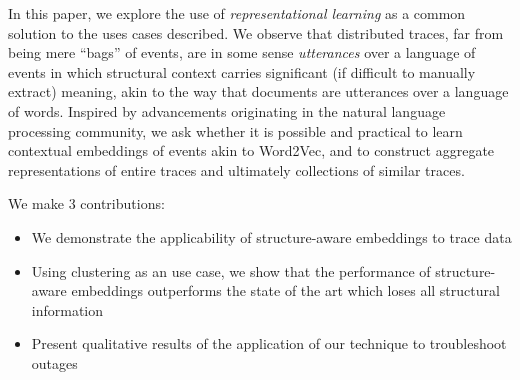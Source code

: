 In this paper, we explore the use of \emph{representational learning} as a common solution to the uses cases described.  We observe that distributed traces, far from being mere ``bags'' of events, are in some sense \emph{utterances} over a language of events in which structural context carries significant (if difficult to manually extract) meaning, akin to the way that documents are utterances over a language of words. Inspired by advancements originating in the natural language processing community, we ask whether it is possible and practical to learn contextual embeddings of events akin to Word2Vec, and to construct aggregate representations of entire traces and ultimately collections of similar traces.

We make 3 contributions: \newline
\begin{itemize}
\item We demonstrate the applicability of structure-aware embeddings to trace data 
\item Using clustering as an use case, we show that the performance of structure-aware embeddings outperforms the state of the art which loses all  structural information
\item Present qualitative results of the application of our technique to troubleshoot outages
\end{itemize}


























